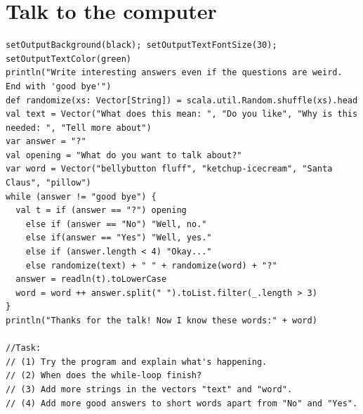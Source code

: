 \chapter{Talk to the computer}
\begin{lstlisting}[basicstyle={\ttfamily\fontsize{13}{16}\selectfont},numbers=none]
setOutputBackground(black); setOutputTextFontSize(30); setOutputTextColor(green)
println("Write interesting answers even if the questions are weird. End with 'good bye'")
def randomize(xs: Vector[String]) = scala.util.Random.shuffle(xs).head
val text = Vector("What does this mean: ", "Do you like", "Why is this needed: ", "Tell more about")
var answer = "?"
val opening = "What do you want to talk about?"
var word = Vector("bellybutton fluff", "ketchup-icecream", "Santa Claus", "pillow") 
while (answer != "good bye") {
  val t = if (answer == "?") opening 
    else if (answer == "No") "Well, no." 
    else if(answer == "Yes") "Well, yes." 
    else if (answer.length < 4) "Okay..." 
    else randomize(text) + " " + randomize(word) + "?"
  answer = readln(t).toLowerCase
  word = word ++ answer.split(" ").toList.filter(_.length > 3) 
} 
println("Thanks for the talk! Now I know these words:" + word)

//Task:
// (1) Try the program and explain what's happening.
// (2) When does the while-loop finish?
// (3) Add more strings in the vectors "text" and "word".
// (4) Add more good answers to short words apart from "No" and "Yes".
\end{lstlisting}
        
